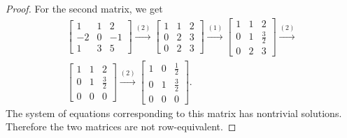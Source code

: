 \begin{proof}
  For the second matrix, we get
  \begin{gather*}
    \begin{bmatrix}
      1 & 1 & 2 \\
      -2 & 0 & -1 \\
      1 & 3 & 5
    \end{bmatrix}
    \xrightarrow{(2)}
    \begin{bmatrix}
      1 & 1 & 2 \\
      0 & 2 & 3 \\
      0 & 2 & 3
    \end{bmatrix}
    \xrightarrow{(1)}
    \begin{bmatrix}
      1 & 1 & 2 \\[3pt]
      0 & 1 & \frac32 \\[3pt]
      0 & 2 & 3
    \end{bmatrix}
    \xrightarrow{(2)} \\
    \begin{bmatrix}
      1 & 1 & 2 \\[3pt]
      0 & 1 & \frac32 \\[3pt]
      0 & 0 & 0
    \end{bmatrix}
    \xrightarrow{(2)}
    \begin{bmatrix}
      1 & 0 & \frac12 \\[3pt]
      0 & 1 & \frac32 \\[3pt]
      0 & 0 & 0
    \end{bmatrix}.
  \end{gather*}
  The system of equations corresponding to this matrix has nontrivial
  solutions. Therefore the two matrices are not row-equivalent.
\end{proof}
